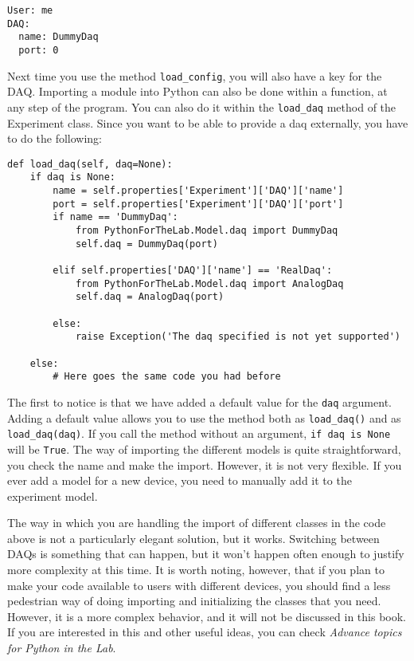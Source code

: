 \begin{verbatim}
User: me
DAQ:
  name: DummyDaq
  port: 0
\end{verbatim}

Next time you use the method \texttt{load_config}, you will also have a
key for the {DAQ}. Importing a module into Python can also be done
within a function, at any step of the program. You can also do it within
the \texttt{load_daq} method of the Experiment class. Since you want to
be able to provide a daq externally, you have to do the following:

\begin{verbatim}
def load_daq(self, daq=None):
    if daq is None:
        name = self.properties['Experiment']['DAQ']['name']
        port = self.properties['Experiment']['DAQ']['port']
        if name == 'DummyDaq':
            from PythonForTheLab.Model.daq import DummyDaq
            self.daq = DummyDaq(port)
        
        elif self.properties['DAQ']['name'] == 'RealDaq':
            from PythonForTheLab.Model.daq import AnalogDaq
            self.daq = AnalogDaq(port)
        
        else:
            raise Exception('The daq specified is not yet supported')
    
    else:
        # Here goes the same code you had before
\end{verbatim}

The first to notice is that we have added a default value for the
\texttt{daq} argument. Adding a default value allows you to use the
method both as \texttt{load_daq()} and as \texttt{load_daq(daq)}. If
you call the method without an argument, \texttt{if daq is None} will
be \texttt{True}. The way of importing the different models is quite
straightforward, you check the name and make the import. However, it is
not very flexible. If you ever add a model for a new device, you need to
manually add it to the experiment model.


The way in which you are handling the import of different classes in the
code above is not a particularly elegant solution, but it works.
Switching between DAQs is something that can happen, but it won't happen
often enough to justify more complexity at this time. It is worth
noting, however, that if you plan to make your code available to users
with different devices, you should find a less pedestrian way of doing
importing and initializing the classes that you need. However, it is a
more complex behavior, and it will not be discussed in this book. If you
are interested in this and other useful ideas, you can check
\emph{Advance topics for Python in the Lab}.

